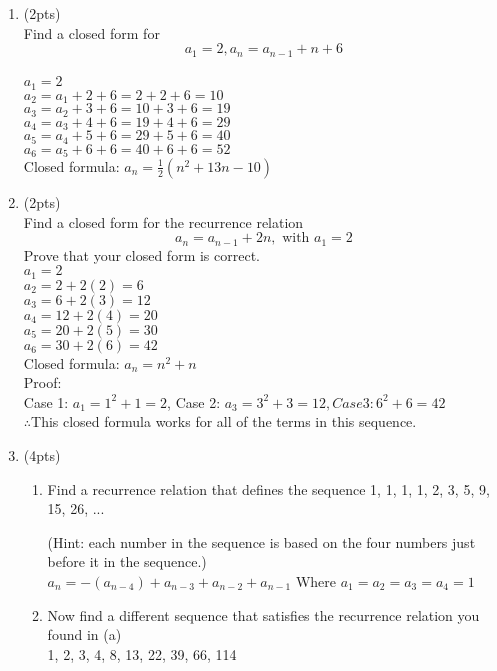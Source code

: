 \documentclass[12pt]{article}
\begin{document}
\begin{enumerate}
\item (2pts) \\
Find a closed form for \[a_{1}=2, a_{n}=a_{n-1}+n+6\]
\\$a_{1} = 2$
\\$a_{2} = a_{1} + 2 + 6 = 2 + 2 + 6 = 10$
\\$a_{3} = a_{2} + 3 + 6 = 10 + 3 + 6 = 19$
\\$a_{4} = a_{3} + 4 + 6 = 19 + 4 + 6 = 29$
\\$a_{5} = a_{4} + 5 + 6 = 29 + 5 + 6 = 40$
\\$a_{6} = a_{5} + 6 + 6 = 40 + 6 + 6 = 52$
\\Closed formula: $a_{n} = \frac{1}{2}(n^2 + 13n - 10)$

\item (2pts) \\
Find a closed form for the recurrence relation \[a_n = a_{n-1} + 2n, \text{ with } a_1 = 2\]
Prove that your closed form is correct.
\\$a_{1} = 2$
\\$a_{2} = 2 + 2(2) = 6$
\\$a_{3} = 6 + 2(3) = 12$
\\$a_{4} = 12 + 2(4) = 20$
\\$a_{5} = 20 + 2(5) = 30$
\\$a_{6} = 30 + 2(6) = 42$
\\Closed formula: $a_{n} = n^2 + n$
\\Proof:
\\Case 1: $a_{1} = 1^2 + 1 = 2$, Case 2: $a_{3} = 3^2 + 3 = 12, Case 3: 6^2 + 6 = 42$
\\$\therefore$This closed formula works for all of the terms in this sequence.

\item (4pts)
\begin{enumerate}
	\item  Find a recurrence relation that defines the sequence 1, 1, 1, 1, 2, 3, 5, 9, 15, 26, ...
	\par (Hint: each number in the sequence is based on the four numbers just before it in the sequence.)
    \\$a_{n} = -(a_{n-4}) + a_{n-3} + a_{n-2} + a_{n-1}$ Where $a_{1}=a_{2}=a_{3}=a_{4}=1$
	\item Now find a different sequence that satisfies the recurrence relation you found in (a)
    \\1, 2, 3, 4, 8, 13, 22, 39, 66, 114
\end{enumerate}


\end{enumerate}
\end{document}
